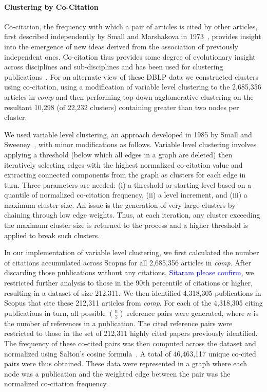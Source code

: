 \paragraph{Clustering by Co-Citation} 
Co-citation, the frequency with which a pair of articles is cited by other articles,  first described independently by Small and Marshakova in 1973~\cite{small_co-citation_1973,marshakova-shaikevich_co-citation_1973},
provides insight into the emergence of new ideas derived from the association of previously independent ones. 
Co-citation thus provides some degree of evolutionary insight across disciplines and sub-disciplines and has been used for clustering publications~\cite{boyack_cocitation_2010,boyack_improving_2013,small_structure_1974,small_clustering_1985}. 
For an alternate view of these DBLP data we constructed clusters using co-citation, using a modification of   variable level clustering to the 2,685,356 articles in \emph{comp} and then performing top-down agglomerative clustering on the resultant 10,298 (of 22,232 clusters) containing greater than two nodes per cluster.  

We used variable level clustering, an approach developed in 1985 by Small and Sweeney~\cite{small_clustering_1985}, with minor modifications as follows. Variable level clustering involves applying a threshold (below which all edges in a graph are deleted) then iteratively selecting edges with the highest normalized co-citation value and extracting connected components from the graph as clusters for each edge in turn. Three parameters are needed: (i) a threshold or starting level based on a quantile of normalized co-citation frequency, (ii) a level increment, and (iii) a maximum cluster size. An issue is the generation of very large clusters by chaining through low edge weights.  Thus, at each iteration, any cluster exceeding the maximum cluster size  is returned to the process and a higher threshold is applied to break such clusters.

In our implementation of variable level clustering, we first calculated the number of citations accumulated across Scopus for all 2,685,356 articles in \emph{comp}. After discarding those publications without any citations, \textcolor{blue}{Sitaram please confirm}, we restricted further analysis to those in the 90th percentile of citations or higher, resulting in a dataset of size 212,311. We then identified 4,318,305 publications in Scopus that cite these 212,311 articles from \emph{comp}. For each of the 4,318,305 citing publications in turn, all possible ${n \choose 2}$ reference pairs were generated, where $n$ is the number of references in a publication. The cited reference pairs were restricted to those in the set of 212,311 highly cited papers previously identified. The frequency of these co-cited pairs was then computed across the dataset  and normalized using Salton's cosine formula~\cite{salton_citation_1979}. A total of 46,463,117 unique co-cited pairs were thus obtained. These data were represented in a graph where each node was a publication and the weighted edge between the pair was the normalized co-citation frequency. \par

